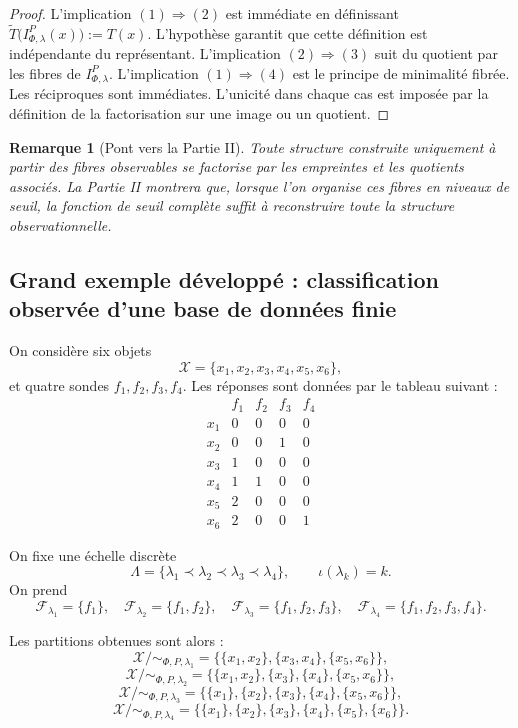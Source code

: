 \documentclass[11pt,a4paper,openany]{book}
\newtheorem{remark}[definition]{Remarque}
\begin{document}
\begin{proof}
L'implication \((1)\Rightarrow(2)\) est immédiate en définissant \(\widetilde T\bigl(I_{\Phi,\lambda}^P(x)\bigr):=T(x)\). L'hypothèse garantit que cette définition est indépendante du représentant. L'implication \((2)\Rightarrow(3)\) suit du quotient par les fibres de \(I_{\Phi,\lambda}^P\). L'implication \((1)\Rightarrow(4)\) est le principe de minimalité fibrée. Les réciproques sont immédiates. L'unicité dans chaque cas est imposée par la définition de la factorisation sur une image ou un quotient.
\end{proof}

\begin{remark}[Pont vers la Partie II]
Toute structure construite uniquement à partir des fibres observables se factorise par les empreintes et les quotients associés. La Partie II montrera que, lorsque l'on organise ces fibres en niveaux de seuil, la fonction de seuil complète suffit à reconstruire toute la structure observationnelle.
\end{remark}

\subsection{Grand exemple développé : classification observée d'une base de données finie}

On considère six objets
\[
\mathcal X=\{x_1,x_2,x_3,x_4,x_5,x_6\},
\]
et quatre sondes \(f_1,f_2,f_3,f_4\). Les réponses sont données par le tableau suivant :
\[
\begin{array}{c|cccc}
& f_1 & f_2 & f_3 & f_4\\ \hline
x_1 & 0 & 0 & 0 & 0\\
x_2 & 0 & 0 & 1 & 0\\
x_3 & 1 & 0 & 0 & 0\\
x_4 & 1 & 1 & 0 & 0\\
x_5 & 2 & 0 & 0 & 0\\
x_6 & 2 & 0 & 0 & 1
\end{array}
\]

On fixe une échelle discrète
\[
\Lambda=\{\lambda_1\prec\lambda_2\prec\lambda_3\prec\lambda_4\},
\qquad
\iota(\lambda_k)=k.
\]
On prend
\[
\mathcal F_{\lambda_1}=\{f_1\},\quad
\mathcal F_{\lambda_2}=\{f_1,f_2\},\quad
\mathcal F_{\lambda_3}=\{f_1,f_2,f_3\},\quad
\mathcal F_{\lambda_4}=\{f_1,f_2,f_3,f_4\}.
\]

Les partitions obtenues sont alors :
\[
\mathcal X/{\sim_{\Phi,P,\lambda_1}}=
\bigl\{\{x_1,x_2\},\{x_3,x_4\},\{x_5,x_6\}\bigr\},
\]
\[
\mathcal X/{\sim_{\Phi,P,\lambda_2}}=
\bigl\{\{x_1,x_2\},\{x_3\},\{x_4\},\{x_5,x_6\}\bigr\},
\]
\[
\mathcal X/{\sim_{\Phi,P,\lambda_3}}=
\bigl\{\{x_1\},\{x_2\},\{x_3\},\{x_4\},\{x_5,x_6\}\bigr\},
\]
\[
\mathcal X/{\sim_{\Phi,P,\lambda_4}}=
\bigl\{\{x_1\},\{x_2\},\{x_3\},\{x_4\},\{x_5\},\{x_6\}\bigr\}.
\]
\end{document}
